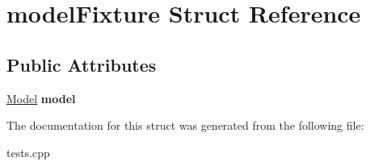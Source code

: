\hypertarget{structmodelFixture}{\section{model\-Fixture Struct Reference}
\label{structmodelFixture}
}
\subsection*{Public Attributes}
\begin{DoxyCompactItemize}
\item 
\hypertarget{structmodelFixture_a9702da6353c7cd38b76d85270e0fea6f}{\hyperlink{classIOSKJ_1_1Model}{Model} {\bfseries model}}\label{structmodelFixture_a9702da6353c7cd38b76d85270e0fea6f}

\end{DoxyCompactItemize}


The documentation for this struct was generated from the following file\-:\begin{DoxyCompactItemize}
\item 
tests.\-cpp\end{DoxyCompactItemize}
